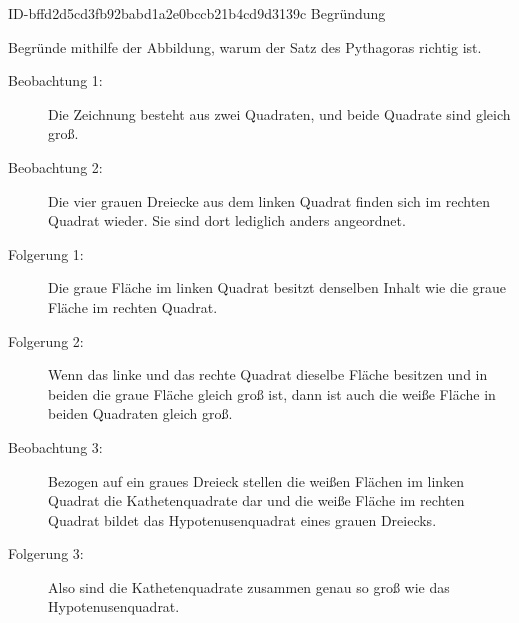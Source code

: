 \begin{exercise}
      {ID-bffd2d5cd3fb92babd1a2e0bccb21b4cd9d3139c}
      {Begründung}
  \ifproblem\problem\par
    Begründe mithilfe der Abbildung, warum der Satz des Pythagoras richtig ist.
    \begin{center}
    \end{center}
  \fi
  \ifoutcome\outcome
    \begin{description}
      \item[Beobachtung 1:]
      Die Zeichnung besteht aus zwei Quadraten, und
      beide Quadrate sind gleich groß.
      \item[Beobachtung 2:]
      Die vier grauen Dreiecke aus dem linken Quadrat
      finden sich im rechten Quadrat wieder.
      Sie sind dort lediglich anders angeordnet.
      \item[Folgerung 1:]
      Die graue Fläche im linken Quadrat besitzt
      denselben Inhalt wie die graue Fläche im
      rechten Quadrat.
      \item[Folgerung 2:]
      Wenn das linke und das rechte Quadrat dieselbe
      Fläche besitzen und in beiden die graue Fläche
      gleich groß ist, dann ist auch die weiße Fläche
      in beiden Quadraten gleich groß.
      \item[Beobachtung 3:]
      Bezogen auf ein graues Dreieck stellen die weißen
      Flächen im linken Quadrat die Kathetenquadrate dar
      und die weiße Fläche im rechten Quadrat bildet das
      Hypotenusenquadrat eines grauen Dreiecks.
      \item[Folgerung 3:]
      Also sind die Kathetenquadrate zusammen genau
      so groß wie das Hypotenusenquadrat.
    \end{description}
  \fi
\end{exercise}
